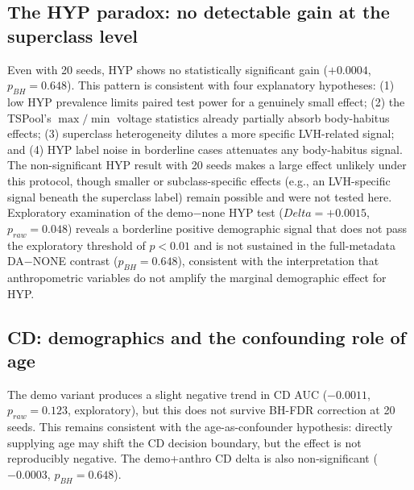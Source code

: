 \documentclass[mathematics,article,pdftex]{Definitions/mdpi}
\def\texttt#1{#1}%
\def\mathrm#1{#1}%
\def\textbf#1{#1}%
\def\Delta{Delta }%
\begin{document}
\subsection{The HYP paradox: no detectable gain at the superclass level}
Even with 20 seeds, \textbf{HYP shows no statistically significant gain} ($+0.0004$, $p_{\mathrm{BH}}{=}0.648$). This pattern is consistent with four explanatory hypotheses: (1) low HYP prevalence limits paired test power for a genuinely small effect; (2) the TSPool's $\max/\min$ voltage statistics already partially absorb body-habitus effects; (3) superclass heterogeneity dilutes a more specific LVH-related signal; and (4) HYP label noise in borderline cases attenuates any body-habitus signal. The non-significant HYP result with 20 seeds makes a large effect unlikely under this protocol, though smaller or subclass-specific effects (e.g., an LVH-specific signal beneath the superclass label) remain possible and were not tested here. Exploratory examination of the \texttt{demo}$-$\texttt{none} HYP test ($\Delta{=}+0.0015$, $p_{\mathrm{raw}}{=}0.048$) reveals a borderline positive demographic signal that does not pass the exploratory threshold of $p{<}0.01$ and is not sustained in the full-metadata DA$-$NONE contrast ($p_{\mathrm{BH}}{=}0.648$), consistent with the interpretation that anthropometric variables do not amplify the marginal demographic effect for HYP.

\subsection{CD: demographics and the confounding role of age}
The \texttt{demo} variant produces a slight negative trend in CD AUC ($-0.0011$, $p_{\mathrm{raw}}{=}0.123$, exploratory), but this does not survive BH-FDR correction at 20 seeds. This remains consistent with the age-as-confounder hypothesis: directly supplying age may shift the CD decision boundary, but the effect is not reproducibly negative. The \texttt{demo+anthro} CD delta is also non-significant ($-0.0003$, $p_{\mathrm{BH}}{=}0.648$).
\end{document}
